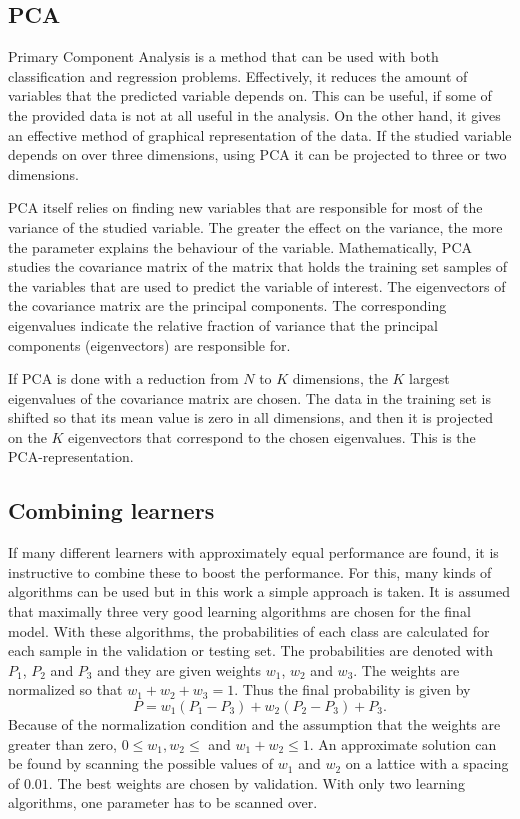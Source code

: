 \documentclass[twoside]{article}
\begin{document}
\begin{multicols}{2}
\subsection{PCA}\label{method:pca}

Primary Component Analysis is a method that can be used with both classification and regression
problems. Effectively, it reduces the amount of variables that the predicted variable depends
on. This can be useful, if some of the provided data is not at all useful in the analysis. On the other
hand, it gives an effective method of graphical representation of the data. If the studied variable
depends on over three dimensions, using PCA it can be projected to three or two dimensions.

PCA itself relies on finding new variables that are responsible for most of the variance of the studied
variable. The greater the effect on the variance, the more the parameter explains the behaviour of the variable.
Mathematically, PCA studies the covariance matrix of the matrix that holds the training set samples of the 
variables that are used to predict the variable of interest. The eigenvectors of the covariance matrix are
the principal components. The corresponding eigenvalues indicate the relative fraction of variance that
the principal components (eigenvectors) are responsible for. 

If PCA is done with a reduction from $N$ to
$K$ dimensions, the $K$ largest eigenvalues of the covariance matrix are chosen. The data in the training set is shifted so that
its mean value is zero in all dimensions, and then it is projected on the $K$ eigenvectors that correspond
to the chosen eigenvalues. This is the PCA-representation.

\subsection{Combining learners}\label{method:combo}

If many different learners with approximately equal performance are found, it is instructive
to combine these to boost the performance. For this, many kinds of algorithms can be used
but in this work a simple approach is taken. It is assumed that maximally three very good
learning algorithms are chosen for the final model. With these algorithms, the probabilities
of each class are calculated for each sample in the validation or testing set. The probabilities
are denoted with $P_1$, $P_2$ and $P_3$ and they are given weights $w_1$, $w_2$ and $w_3$.
The weights are normalized so that $w_1 + w_2 + w_3 = 1$. Thus the final probability is given by
\begin{equation}
 P = w_1 ( P_1 - P_3 ) + w_2 ( P_2 - P_3 ) + P_3.
\end{equation}
Because of the normalization condition and the assumption that the weights are greater than zero,  $0 \leq w_1,w_2 \leq$ and $w_1 + w_2 \leq 1$. 
An approximate solution can be found by scanning the possible values of $w_1$ and $w_2$ on a lattice with a spacing of $0.01$.
The best weights are chosen by validation. With only two learning algorithms, one parameter has to be scanned over.


\end{multicols}
\end{document}
